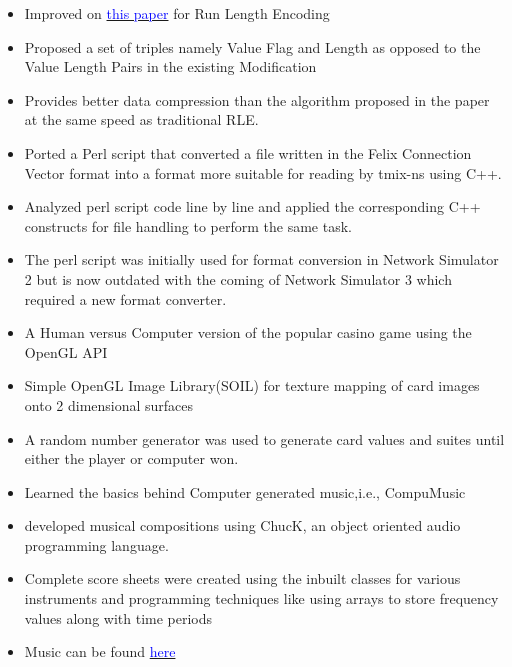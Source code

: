 \documentclass[12pt,a4paper,roman]{moderncv}        %
\begin{document}
\begin{itemize}[noitemsep]
\item Improved on {\href{http://ieeexplore.ieee.org/stamp/stamp.jsp?arnumber=6148417}{\textcolor{blue}{this paper}}} for Run Length Encoding
\item Proposed a set of triples namely Value Flag and Length as opposed to the Value Length Pairs in the existing Modification
\item Provides better data compression than the algorithm proposed in the paper at the same speed as traditional RLE.
\end{itemize}

\begin{itemize}[noitemsep]
\item Ported a Perl script that converted a file written in the Felix Connection Vector format into a format more suitable for reading by tmix-ns using C++.
\item Analyzed perl script code line by line and applied the corresponding C++ constructs for file handling to perform the same task.
\item The perl script was initially used for format conversion in Network Simulator 2 but is now outdated with the coming of Network Simulator 3 which required a new format converter.
\end{itemize}


\begin{itemize}[noitemsep]
\item A Human versus Computer version of the popular casino game using the OpenGL API
\item Simple OpenGL Image Library(SOIL) for texture mapping of card images onto 2 dimensional surfaces
\item A random number generator was used to generate card values and suites until either the player or computer won.
\end{itemize}

\begin{itemize}[noitemsep]
\item Learned the basics behind Computer generated music,i.e., CompuMusic
\item developed musical compositions using ChucK, an object oriented audio programming language. 
\item Complete score sheets were created using the inbuilt classes for various instruments and programming techniques like using arrays to store frequency values along with time periods
\item Music can be found \href{https://soundcloud.com/ujjwal-pasupulety}{\textcolor{blue}{here}}
\newline
\end{itemize}
\end{document}
